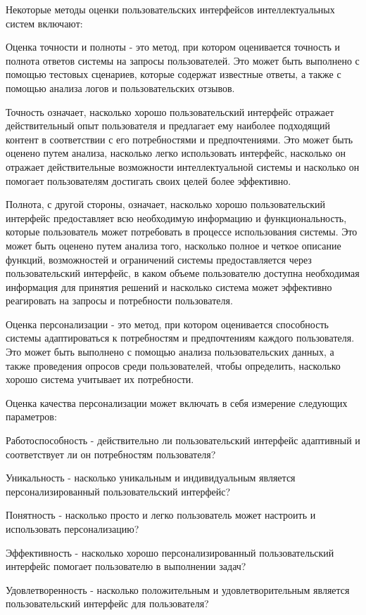 Некоторые методы оценки пользовательских интерфейсов интеллектуальных систем включают:
\begin{textitemize}
	\item Оценка точности и полноты - это метод, при котором оценивается точность и полнота ответов системы на запросы пользователей. Это может быть выполнено с помощью тестовых сценариев, которые содержат известные ответы, а также с помощью анализа логов и пользовательских отзывов.
	
	Точность означает, насколько хорошо пользовательский интерфейс отражает действительный опыт пользователя и предлагает ему наиболее подходящий контент в соответствии с его потребностями и предпочтениями. Это может быть оценено путем анализа, насколько легко использовать интерфейс, насколько он отражает действительные возможности интеллектуальной системы и насколько он помогает пользователям достигать своих целей более эффективно.
	
	Полнота, с другой стороны, означает, насколько хорошо пользовательский интерфейс предоставляет всю необходимую информацию и функциональность, которые пользователь может потребовать в процессе использования системы. Это может быть оценено путем анализа того, насколько полное и четкое описание функций, возможностей и ограничений системы предоставляется через пользовательский интерфейс, в каком объеме пользователю доступна необходимая информация для принятия решений и насколько система может эффективно реагировать на запросы и потребности пользователя.
	
	\item Оценка персонализации - это метод, при котором оценивается способность системы адаптироваться к потребностям и предпочтениям каждого пользователя. Это может быть выполнено с помощью анализа пользовательских данных, а также проведения опросов среди пользователей, чтобы определить, насколько хорошо система учитывает их потребности.
	
	Оценка качества персонализации может включать в себя измерение следующих параметров:
	\begin{textitemize}
	\item Работоспособность - действительно ли пользовательский интерфейс адаптивный и соответствует ли он потребностям пользователя?
	\item Уникальность - насколько уникальным и индивидуальным является персонализированный пользовательский интерфейс?
	\item Понятность - насколько просто и легко пользователь может настроить и использовать персонализацию?
	\item Эффективность - насколько хорошо персонализированный пользовательский интерфейс помогает пользователю в выполнении задач?
	\item Удовлетворенность - насколько положительным и удовлетворительным является пользовательский интерфейс для пользователя?
	\end{textitemize}


\end{textitemize}

